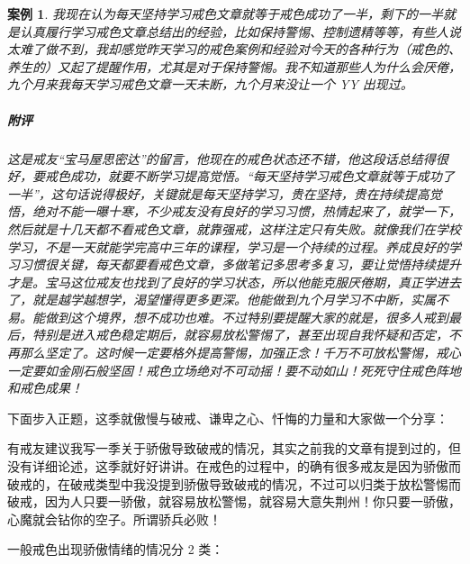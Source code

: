 \documentclass{ctexart}
\newtheorem{case}{案例}
\begin{document}
\begin{case}
    我现在认为每天坚持学习戒色文章就等于戒色成功了一半，剩下的一半就是认真履行学习戒色文章总结出的经验，比如保持警惕、控制遗精等等，有些人说太难了做不到，我却感觉昨天学习的戒色案例和经验对今天的各种行为（戒色的、养生的）又起了提醒作用，尤其是对于保持警惕。我不知道那些人为什么会厌倦，九个月来我每天学习戒色文章一天未断，九个月来没让一个 YY 出现过。
    \subparagraph{附评} 这是戒友“宝马屋思密达”的留言，他现在的戒色状态还不错，他这段话总结得很好，要戒色成功，就要不断学习提高觉悟。“每天坚持学习戒色文章就等于成功了一半”，这句话说得极好，关键就是每天坚持学习，贵在坚持，贵在持续提高觉悟，绝对不能一曝十寒，不少戒友没有良好的学习习惯，热情起来了，就学一下，然后就是十几天都不看戒色文章，就靠强戒，这样注定只有失败。就像我们在学校学习，不是一天就能学完高中三年的课程，学习是一个持续的过程。养成良好的学习习惯很关键，每天都要看戒色文章，多做笔记多思考多复习，要让觉悟持续提升才是。宝马这位戒友也找到了良好的学习状态，所以他能克服厌倦期，真正学进去了，就是越学越想学，渴望懂得更多更深。他能做到九个月学习不中断，实属不易。能做到这个境界，想不成功也难。不过特别要提醒大家的就是，很多人戒到最后，特别是进入戒色稳定期后，就容易放松警惕了，甚至出现自我怀疑和否定，不再那么坚定了。这时候一定要格外提高警惕，加强正念！千万不可放松警惕，戒心一定要如金刚石般坚固！戒色立场绝对不可动摇！要不动如山！死死守住戒色阵地和戒色成果！
\end{case}

下面步入正题，这季就傲慢与破戒、谦卑之心、忏悔的力量和大家做一个分享：

有戒友建议我写一季关于骄傲导致破戒的情况，其实之前我的文章有提到过的，但没有详细论述，这季就好好讲讲。在戒色的过程中，的确有很多戒友是因为骄傲而破戒的，在破戒类型中我没提到骄傲导致破戒的情况，不过可以归类于放松警惕而破戒，因为人只要一骄傲，就容易放松警惕，就容易大意失荆州！你只要一骄傲，心魔就会钻你的空子。所谓骄兵必败！

一般戒色出现骄傲情绪的情况分 2 类：
\end{document}
